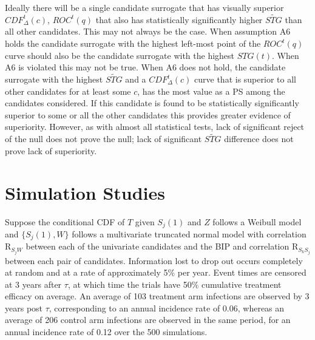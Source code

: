 \documentclass[times, doublespace]{simauth}
\begin{document}
Ideally there will be a single candidate surrogate that has visually superior $CDF^{t}_{\Delta}(c)$, $ROC^{t}(q)$ that also has statistically significantly higher $\widetilde{STG}$ than all other candidates. This may not always be the case. When assumption A6 holds the candidate surrogate with the highest left-most point of the $ROC^{t}(q)$ curve should also be the candidate surrogate with the highest $STG(t)$. When A6 is violated this may not be true. When A6 does not hold, the candidate surrogate with the highest $\widetilde{STG}$ and a $CDF^{t}_{\Delta}(c)$ curve that is superior to all other candidates for at least some $c$, has the most value as a PS among the candidates considered. If this candidate is found to be statistically significantly superior to some or all the other candidates this provides greater evidence of superiority. However, as with almost all statistical tests, lack of significant reject of the null does not prove the null; lack of significant  $\widetilde{STG}$ difference does not prove lack of superiority.

\section{Simulation Studies}
Suppose the conditional CDF of $T$ given $S_j(1)$ and $Z$ follows a Weibull model and $\{S_j(1),W\}$ follows a multivariate truncated normal model with correlation R$_{S_jW}$ between each of the univariate candidates and the BIP and correlation R$_{S_kS_j}$ between each pair of candidates. Information lost to drop out occurs completely at random and at a rate of approximately 5\% per year. Event times are censored at 3 years after $\tau$, at which time the trials have 50\% cumulative treatment efficacy on average. An average of 103 treatment arm infections are observed by 3 years post $\tau$, corresponding to an annual incidence rate of 0.06, whereas an average of 206 control arm infections are observed in the same period, for an annual incidence rate of 0.12 over the 500 simulations. 
\end{document}
